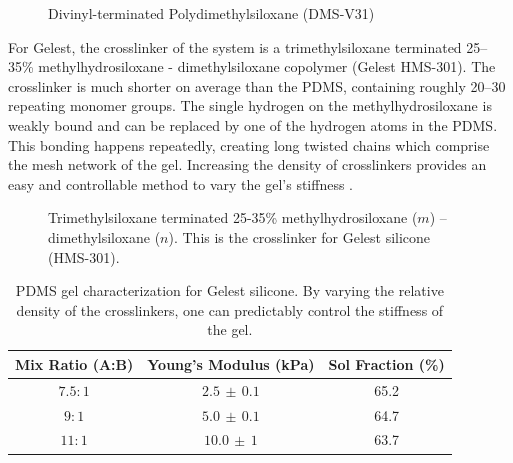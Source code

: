 \begin{figure}[h!]
	\centering
	\label{fig:DMS-V31}
	\caption[DMS-V31]{Divinyl-terminated Polydimethylsiloxane (DMS-V31)}
\end{figure}
\noindent For Gelest, the crosslinker of the system is a trimethylsiloxane terminated 25--35\% methylhydrosiloxane - dimethylsiloxane copolymer (Gelest HMS-301). The crosslinker is much shorter on average than the PDMS, containing roughly 20--30 repeating monomer groups. The single hydrogen on the methylhydrosiloxane is weakly bound and can be replaced by one of the hydrogen atoms in the PDMS. This bonding happens repeatedly, creating long twisted chains which comprise the mesh network of the gel. Increasing the density of crosslinkers provides an easy and controllable method to vary the gel's stiffness \cite{Andreotti2020}. 

\begin{figure}
	\centering
	\label{fig:HMS-301}
	\caption[HMS-301]{Trimethylsiloxane terminated 25-35\% methylhydrosiloxane ($m$) -- dimethylsiloxane ($n$). This is the crosslinker for Gelest silicone (HMS-301).}
\end{figure}

\begin{table}[h!]
	\begin{center}
		\begin{tabular}{|c||c||c|}
			\hline
			Mix Ratio (A:B) & Young's Modulus (kPa) & Sol Fraction (\%)\\
			\hline
			$7.5:1$ & $2.5 \,\pm\, 0.1$ & 65.2\\
			\hline
			$9:1$ & $5.0 \, \pm\, 0.1$  & 64.7\\
			\hline
			$11:1$ & $10.0 \,\pm\, 1$  & 63.7\\
			\hline
		\end{tabular}
	\end{center}
	\label{tab:recipes}
	\caption[PDMS ratios Characterization]{PDMS gel characterization for Gelest silicone. By varying the relative density of the crosslinkers, one can predictably control the stiffness of the gel.}
\end{table}




